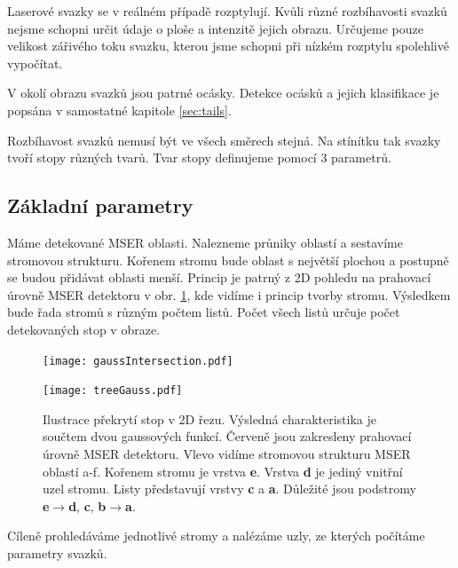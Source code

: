 Laserové svazky se v reálném případě rozptylují. Kvůli různé rozbíhavosti svazků nejsme schopni určit údaje o ploše a intenzitě jejich obrazu. Určujeme pouze velikost zářivého toku svazku, kterou jsme schopni při nízkém rozptylu spolehlivě vypočítat.   

V okolí obrazu svazků jsou patrné ocásky. Detekce ocásků a jejich klasifikace je popsána v samostatné kapitole \ref{sec:tails}.

Rozbíhavost svazků nemusí být ve všech směrech stejná. Na stínítku tak svazky tvoří stopy různých tvarů. Tvar stopy definujeme pomocí 3 parametrů.

\subsection{Základní parametry}

Máme detekované MSER oblasti. Nalezneme průniky oblastí a sestavíme stromovou strukturu. Kořenem stromu bude oblast s největší plochou a postupně se budou přidávat oblasti menší. Princip je patrný z 2D pohledu na prahovací úrovně MSER detektoru v obr. \ref{fig:gaussIntersection}, kde vidíme i princip tvorby stromu. Výsledkem bude řada stromů s různým počtem listů. Počet všech listů určuje počet detekovaných stop v obraze.

\begin{figure}[htbp]
    \centering
	\begin{minipage}[c]{0.78 \textwidth}
    \texttt{[image: gaussIntersection.pdf]}
    \end{minipage}
    \begin{minipage}[c]{0.16 \textwidth}
    \texttt{[image: treeGauss.pdf]}
    \end{minipage}
    
    
     \caption[]{Ilustrace překrytí stop v 2D řezu. Výsledná charakteristika je součtem dvou gaussových funkcí. Červeně jsou zakresleny prahovací úrovně MSER detektoru. Vlevo vidíme stromovou strukturu MSER oblastí a-f. Kořenem stromu je vrstva \textbf{e}. Vrstva \textbf{d} je jediný vnitřní uzel stromu. Listy představují vrstvy \textbf{c} a \textbf{a}. Důležité jsou podstromy \textbf{e}$\rightarrow$\textbf{d}, \textbf{c}, \textbf{b}$\rightarrow$\textbf{a}.}
        \label{fig:gaussIntersection}
\end{figure}

Cíleně prohledáváme jednotlivé stromy a nalézáme uzly, ze kterých počítáme parametry svazků.

